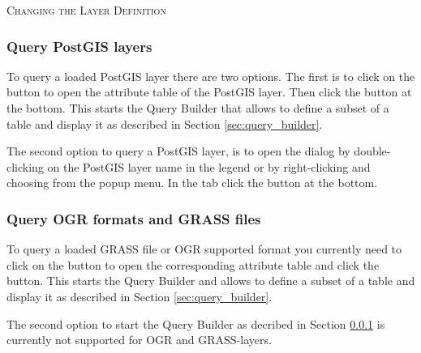 \begin{Tip}\caption{\textsc{Changing the Layer Definition}}
\end{Tip}

\subsubsection{Query PostGIS layers}\label{sec:query_builder_postgis}

To query a loaded PostGIS layer there are two options. The first is to click on the 
button  to open the attribute table of the PostGIS layer. Then 
click the  button at the bottom. This starts the Query Builder 
that allows to define a subset of a table and display it as described in Section 
\ref{sec:query_builder}.

The second option to query a PostGIS layer, is to open the  
dialog by double-clicking on the PostGIS layer name in the legend or 
by right-clicking and choosing  from the popup menu. In the tab 
 click the  button at the bottom.

\subsubsection{Query OGR formats and GRASS files}\label{sec:query_builder_ogrgrass}

To query a loaded GRASS file or OGR supported format you currently need to click on the 
button  to open the corresponding attribute table and click the 
 button. This starts the Query Builder and allows to define a 
subset of a table and display it as described in Section \ref{sec:query_builder}. 

The second option to start the Query Builder as decribed in Section 
\ref{sec:query_builder_postgis} is currently not supported for OGR and GRASS-layers.

